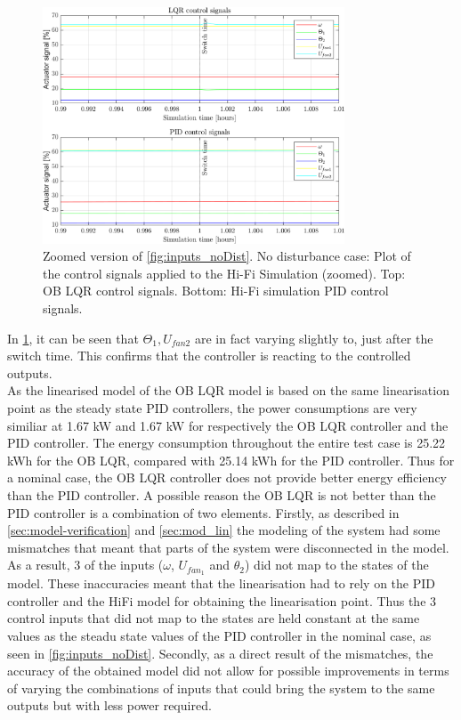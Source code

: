 \begin{figure}[H]
	\centering
	\includegraphics[width=0.8\textwidth]{Graphics/fig_inputs_noDist_zoom.png}
	\caption{Zoomed version of \cref{fig:inputs_noDist}. No disturbance case: Plot of the control signals applied to the Hi-Fi Simulation (zoomed). Top: OB LQR control signals. Bottom: Hi-Fi simulation PID control signals.}
	\label{fig:inputs_noDist_zoom}
\end{figure}
 
In \cref{fig:inputs_noDist_zoom}, it can be seen that $ \Theta_1, U_{fan2} $ are in fact varying slightly to, just after the switch time. This confirms that the controller is reacting to the controlled outputs. \\
\noindent As the linearised model of the OB LQR model is based on the same linearisation point as the steady state PID controllers, the power consumptions are very similiar at 1.67 \si{kW} and 1.67 \si{kW} for respectively the OB LQR controller and the PID controller. The energy consumption throughout the entire test case is 25.22 \si{kWh} for the OB LQR, compared with 25.14 \si{kWh} for the PID controller. Thus for a nominal case, the OB LQR controller does not provide better energy efficiency than the PID controller. A possible reason the OB LQR is not better than the PID controller is a combination of two elements. Firstly, as described in \cref{sec:model-verification} and \cref{sec:mod_lin} the modeling of the system had some mismatches that meant that parts of the system were disconnected in the model. As a result, 3 of the inputs ($\omega$, $U_{fan_1}$ and $\theta_2$) did not map to the states of the model. These inaccuracies meant that the linearisation had to rely on the PID controller and the HiFi model for obtaining the linearisation point. Thus the 3 control inputs that did not map to the states are held constant at the same values as the steadu state values of the PID controller in the nominal case, as seen in \cref{fig:inputs_noDist}. Secondly, as a direct result of the mismatches, the accuracy of the obtained model did not allow for possible improvements in terms of varying the combinations of inputs that could bring the system to the same outputs but with less power required. 


